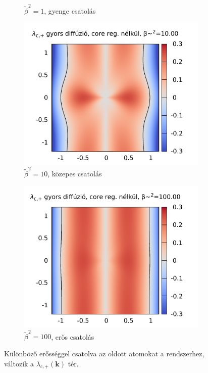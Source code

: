 \documentclass[10pt,a4paper]{scrartcl}
\let\mathbf\bm
\begin{document}
\begin{figure}[htb]
\begin{subfigure}[t]{0.495\linewidth}
\caption{$\tilde \beta^2=1$, gyenge csatolás}
\end{subfigure}
\begin{subfigure}[t]{0.495\linewidth}
\centering\includegraphics[scale=0.95]{"figs/lambda_c_k_surface_btsq=10"}
\caption{$\tilde \beta^2=10$, közepes csatolás}
\end{subfigure}
\begin{subfigure}[t]{0.495\linewidth}
\centering\includegraphics[scale=0.95]{"figs/lambda_c_k_surface_btsq=100"}
\caption{$\tilde \beta^2=100$, erős csatolás}
\end{subfigure}
\caption{Különböző erősséggel csatolva az oldott atomokat a rendszerhez, változik a ${\lambda _{c, + }}\left( {\mathbf{k}} \right)$ tér.}
\end{figure}
\FloatBarrier
\end{document}
